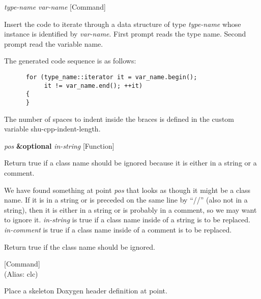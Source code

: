 \vspace{1em}
\noindent
{}
\usebox{\funcname}\emph{type-name} \emph{var-name}
 \hfill [Command]

\begin{doc-string}
Insert the code to iterate through a data structure of type \emph{type-name} whose
instance is identified by \emph{var-name}.  First prompt reads the type name.  Second
prompt read the variable name.

The generated code sequence is as follows:

\small{\begin{verbatim}
      for (type_name::iterator it = var_name.begin();
           it != var_name.end(); ++it)
      {
      }
\end{verbatim}}

The number of spaces to indent inside the braces is defined in the custom
variable shu-cpp-indent-length.
\end{doc-string}

\vspace{1em}
\noindent
{}
\usebox{\funcname}\emph{pos} \textbf{\&optional} \emph{in-string}
 \hfill [Function]
\hspace*{\wd\funcname}

\begin{doc-string}
Return true if a class name should be ignored because it is either in a
string or a comment.

We have found something at point \emph{pos} that looks as though it might be a class
name.  If it is in a string or is preceded on the same line by ``//'' (also not
in a string), then it is either in a string or is probably in a comment, so we
may want to ignore it.  \emph{in-string} is true if a class name inside of a string is
to be replaced.  \emph{in-comment} is true if a class name inside of a comment is to be
replaced.

Return true if the class name should be ignored.
\end{doc-string}

\vspace{1em}
\noindent
{}
\usebox{\funcname}
 \hfill [Command]\\%
 (Alias: clc)

\begin{doc-string}
Place a skeleton Doxygen header definition at point.
\end{doc-string}

